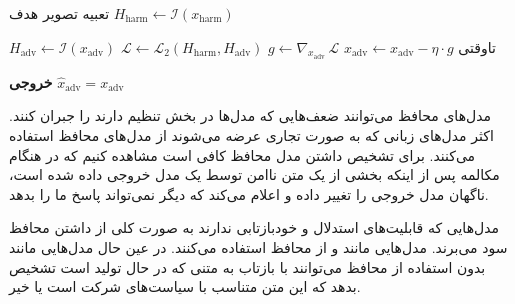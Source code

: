  تعبیه تصویر هدف
 $H_{\mathrm{harm}} \gets \mathcal{I}(x_{\mathrm{harm}})$

     $H_{\mathrm{adv}} \gets \mathcal{I}(x_{\mathrm{adv}})$
     $\mathcal{L} \gets \mathcal{L}_{2}(H_{\mathrm{harm}}, H_{\mathrm{adv}})$ 
     $g \gets \nabla_{x_{\mathrm{adv}}}\,\mathcal{L}$
     $x_{\mathrm{adv}} \gets x_{\mathrm{adv}} - \eta \cdot g$
‌تاوقتی

 \textbf{خروجی} $\hat{x}_{\mathrm{adv}} = x_{\mathrm{adv}}$



مدل‌های محافظ می‌توانند ضعف‌هایی که مدل‌ها در بخش تنظیم دارند را جبران کنند. اکثر مدل‌های زبانی که به صورت تجاری عرضه می‌شوند از مدل‌های محافظ استفاده می‌کنند. برای تشخیص داشتن مدل محافظ کافی است مشاهده کنیم که در هنگام مکالمه پس از اینکه بخشی از یک متن ناامن توسط یک مدل خروجی داده شده است، ناگهان مدل خروجی را تغییر داده و اعلام می‌کند که دیگر نمی‌تواند پاسخ ما را بدهد.

مدل‌هایی که قابلیت‌های استدلال و خودبازتابی ندارند به صورت کلی از داشتن محافظ سود می‌برند. مدل‌هایی مانند  و  از محافظ استفاده می‌کنند. در عین حال مدل‌هایی مانند  بدون استفاده از محافظ می‌توانند با بازتاب به متنی که در حال تولید است تشخیص بدهد که این متن متناسب با سیاست‌های شرکت است یا خیر.


